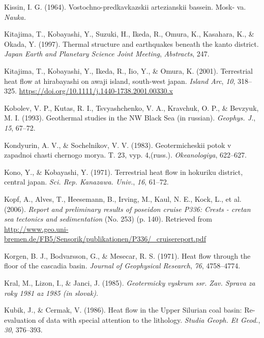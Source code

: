 \begin{CSLReferences}{1}{1}
\leavevmode{}%
Kissin, I. G. (1964). Vostochno-predkavkazskii artezianskii bassein. Mosk- va. \emph{Nauka.}

\leavevmode{}%
Kitajima, T., Kobayashi, Y., Suzuki, H., Ikeda, R., Omura, K., Kasahara, K., \& Okada, Y. (1997). Thermal structure and earthquakes beneath the kanto district. \emph{Japan Earth and Planetary Science Joint Meeting}, \emph{Abstracts}, 247.

\leavevmode{}%
Kitajima, T., Kobayashi, Y., Ikeda, R., Iio, Y., \& Omura, K. (2001). Terrestrial heat flow at hirabayashi on awaji island, south-west japan. \emph{Island Arc}, \emph{10}, 318--325. \url{https://doi.org/10.1111/j.1440-1738.2001.00330.x}

\leavevmode{}%
Kobolev, V. P., Kutas, R. I., Tsvyashchenko, V. A., Kravchuk, O. P., \& Bevzyuk, M. I. (1993). Geothermal studies in the {NW Black Sea} (in russian). \emph{Geophys. J.}, \emph{15}, 67--72.

\leavevmode{}%
Kondyurin, A. V., \& Sochelnikov, V. V. (1983). Geotermicheskii potok v zapadnoi chasti chernogo morya. T. 23, vyp. 4,(russ.). \emph{Okeanologiya}, 622--627.

\leavevmode{}%
Kono, Y., \& Kobayashi, Y. (1971). Terrestrial heat flow in hokuriku district, central japan. \emph{Sci. Rep. Kanazawa. Univ.}, \emph{16}, 61--72.

\leavevmode{}%
Kopf, A., Alves, T., Heesemann, B., Irving, M., Kaul, N. E., Kock, L., et al. (2006). \emph{Report and preliminary results of poseidon cruise P336: Crests - cretan sea tectonics and sedimentation} (No. 253) (p. 140). Retrieved from \url{http://www.geo.uni-bremen.de/FB5/Sensorik/publikationen/P336/_cruisereport.pdf}

\leavevmode{}%
Korgen, B. J., Bodvarsson, G., \& Mesecar, R. S. (1971). Heat flow through the floor of the cascadia basin. \emph{Journal of Geophysical Research}, \emph{76}, 4758--4774.

\leavevmode{}%
Kral, M., Lizon, I., \& Janci, J. (1985). \emph{Geotermicky vyskrum ssr. Zav. Sprava za roky 1981 az 1985 (in slovak)}.

\leavevmode{}%
Kubik, J., \& Cermak, V. (1986). Heat flow in the {Upper Silurian} coal basin: Re-evaluation of data with special attention to the lithology. \emph{Studia Geoph. Et Geod.}, \emph{30}, 376--393.


\end{CSLReferences}
